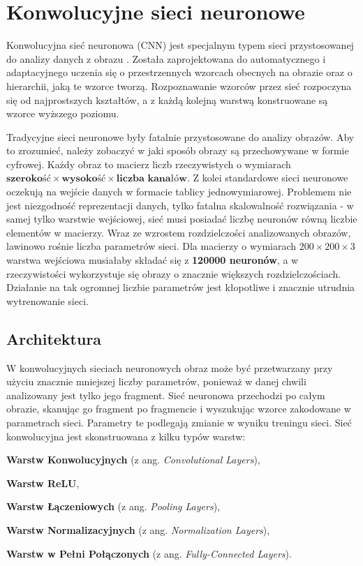 \chapter{Konwolucyjne sieci neuronowe}
\label{CNNsChapter}
\vspace{-1cm}
Konwolucyjna sieć neuronowa (CNN) jest specjalnym typem sieci przystosowanej do analizy danych z obrazu \cite{baheti:cnnGuide, springer:cnnOverview}. Została zaprojektowana do automatycznego i adaptacyjnego uczenia się o przestrzennych wzorcach obecnych na obrazie oraz o hierarchii, jaką te wzorce tworzą. Rozpoznawanie wzorców przez sieć rozpoczyna się od najprostszych kształtów, a z każdą kolejną warstwą konstruowane są wzorce wyższego poziomu.

Tradycyjne sieci neuronowe były fatalnie przystosowane do analizy obrazów. Aby to zrozumieć, należy zobaczyć w jaki sposób obrazy są przechowywane w formie cyfrowej. Każdy obraz to macierz liczb rzeczywistych o wymiarach $\textbf{szerokość} \times \textbf{wysokość} \times \textbf{liczba kanałów}$. Z kolei standardowe sieci neuronowe oczekują na wejście danych w formacie tablicy jednowymiarowej. Problemem nie jest niezgodność reprezentacji danych, tylko fatalna skalowalność rozwiązania - w samej tylko warstwie wejściowej, sieć musi posiadać liczbę neuronów równą liczbie elementów w macierzy. Wraz ze wzrostem rozdzielczości analizowanych obrazów, lawinowo rośnie liczba parametrów sieci. Dla macierzy o wymiarach $200 \times 200 \times 3$ warstwa wejściowa musiałaby składać się z \textbf{120000 neuronów}, a w rzeczywistości wykorzystuje się obrazy o znacznie większych rozdzielczościach. Działanie na tak ogromnej liczbie parametrów jest kłopotliwe i znacznie utrudnia wytrenowanie sieci.

\section{Architektura}
W konwolucyjnych sieciach neuronowych obraz może być przetwarzany przy użyciu znacznie mniejszej liczby parametrów, ponieważ w danej chwili analizowany jest tylko jego fragment. Sieć neuronowa przechodzi po całym obrazie, skanując go fragment po fragmencie i wyszukując wzorce zakodowane w parametrach sieci. Parametry te podlegają zmianie w wyniku treningu sieci. Sieć konwolucyjna jest skonstruowana z kilku typów warstw:

\vspace{-0.5cm}
\begin{enumerate*}
\item \textbf{Warstw Konwolucyjnych} (z ang. \textit{Convolutional Layers}),
\item \textbf{Warstw ReLU},
\item \textbf{Warstw Łączeniowych} (z ang. \textit{Pooling Layers}),
\item \textbf{Warstw Normalizacyjnych} (z ang. \textit{Normalization Layers}),
\item \textbf{Warstw w Pełni Połączonych} (z ang. \textit{Fully-Connected Layers}).
\end{enumerate*}

